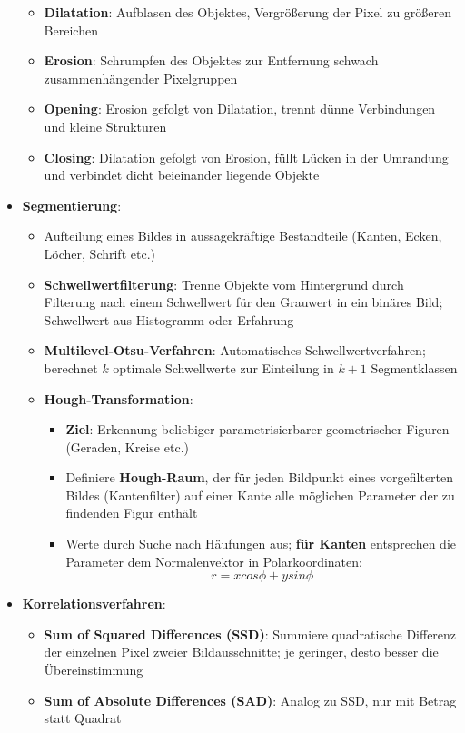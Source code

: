 \begin{itemize}
\begin{itemize}
		\item \textbf{Dilatation}: Aufblasen des Objektes, Vergrößerung der Pixel zu größeren Bereichen
		\item \textbf{Erosion}: Schrumpfen des Objektes zur Entfernung schwach zusammenhängender Pixelgruppen
		\item \textbf{Opening}: Erosion gefolgt von Dilatation, trennt dünne Verbindungen und kleine Strukturen
		\item \textbf{Closing}: Dilatation gefolgt von Erosion, füllt Lücken in der Umrandung und verbindet dicht beieinander liegende Objekte
	\end{itemize}
	\item \textbf{Segmentierung}:
	\begin{itemize}
		\item Aufteilung eines Bildes in aussagekräftige Bestandteile (Kanten, Ecken, Löcher, Schrift etc.)
		\item \textbf{Schwellwertfilterung}: Trenne Objekte vom Hintergrund durch Filterung nach einem Schwellwert für den Grauwert in ein binäres Bild; Schwellwert aus Histogramm oder Erfahrung
		\item \textbf{Multilevel-Otsu-Verfahren}: Automatisches Schwellwertverfahren; berechnet $k$ optimale Schwellwerte zur Einteilung in $k + 1$ Segmentklassen
		\item \textbf{Hough-Transformation}:
		\begin{itemize}
			\item \textbf{Ziel}: Erkennung beliebiger parametrisierbarer geometrischer Figuren (Geraden, Kreise etc.)
			\item Definiere \textbf{Hough-Raum}, der für jeden Bildpunkt eines vorgefilterten Bildes (Kantenfilter) auf einer Kante alle möglichen Parameter der zu findenden Figur enthält
			\item Werte durch Suche nach Häufungen aus; \textbf{für Kanten} entsprechen die Parameter dem Normalenvektor in Polarkoordinaten:
				$$
					r = xcos\phi + ysin\phi
				$$
		\end{itemize}
	\end{itemize}
	\item \textbf{Korrelationsverfahren}:
	\begin{itemize}
		\item \textbf{Sum of Squared Differences (SSD)}: Summiere quadratische Differenz der einzelnen Pixel zweier Bildausschnitte; je geringer, desto besser die Übereinstimmung
		\item \textbf{Sum of Absolute Differences (SAD)}: Analog zu SSD, nur mit Betrag statt Quadrat
	\end{itemize}
\end{itemize}